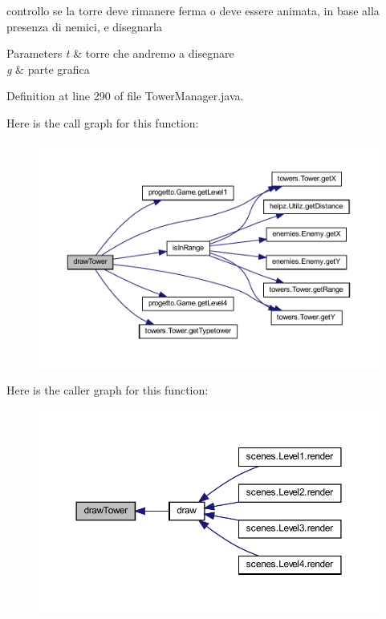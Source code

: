 controllo se la torre deve rimanere ferma o deve essere animata, in base alla presenza di nemici, e disegnarla 


\begin{DoxyParams}{Parameters}
{\em t} & torre che andremo a disegnare \\
\hline
{\em g} & parte grafica \\
\hline
\end{DoxyParams}


Definition at line 290 of file Tower\+Manager.\+java.

Here is the call graph for this function\+:
\nopagebreak
\begin{figure}[H]
\begin{center}
\leavevmode
\includegraphics[width=350pt]{classmanagers_1_1_tower_manager_a2cbe196e347dcc9a69a4d3dfdbec72de_cgraph}
\end{center}
\end{figure}
Here is the caller graph for this function\+:
\nopagebreak
\begin{figure}[H]
\begin{center}
\leavevmode
\includegraphics[width=350pt]{classmanagers_1_1_tower_manager_a2cbe196e347dcc9a69a4d3dfdbec72de_icgraph}
\end{center}
\end{figure}
\mbox{\label{classmanagers_1_1_tower_manager_a4345f2e80059788e5ab1dd1cf0ff2c04}} 
